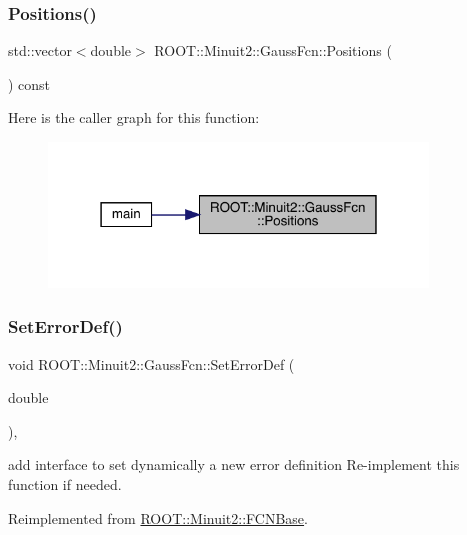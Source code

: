 \subsubsection{\texorpdfstring{Positions()}{Positions()}}
{\footnotesize\ttfamily std\+::vector$<$double$>$ R\+O\+O\+T\+::\+Minuit2\+::\+Gauss\+Fcn\+::\+Positions (\begin{DoxyParamCaption}{ }\end{DoxyParamCaption}) const\hspace{0.3cm}{\ttfamily [inline]}}

Here is the caller graph for this function\+:\nopagebreak
\begin{figure}[H]
\begin{center}
\leavevmode
\includegraphics[width=286pt]{de/dc1/classROOT_1_1Minuit2_1_1GaussFcn_a7098b4a70f063917479335d5f1d7473a_icgraph}
\end{center}
\end{figure}
\mbox{\label{classROOT_1_1Minuit2_1_1GaussFcn_ad6ab65c15a43f72db27fd6ddf26486f9}} 
\subsubsection{\texorpdfstring{SetErrorDef()}{SetErrorDef()}}
{\footnotesize\ttfamily void R\+O\+O\+T\+::\+Minuit2\+::\+Gauss\+Fcn\+::\+Set\+Error\+Def (\begin{DoxyParamCaption}\item[{double}]{ }\end{DoxyParamCaption})\hspace{0.3cm}{\ttfamily [inline]}, {\ttfamily [virtual]}}

add interface to set dynamically a new error definition Re-\/implement this function if needed. 

Reimplemented from \mbox{\hyperlink{classROOT_1_1Minuit2_1_1FCNBase_a840e02c2e6ef96eec289deca096b6088}{R\+O\+O\+T\+::\+Minuit2\+::\+F\+C\+N\+Base}}.


